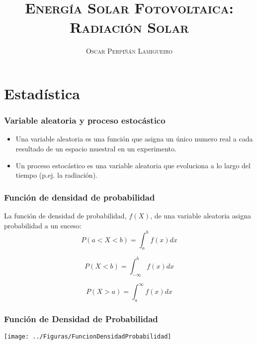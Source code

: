 \documentclass[serif, xcolor=dvipsnames]{beamer}
\begin{document}
\title{\textsc{Energía Solar Fotovoltaica:}\\
\textsc{Radiación Solar}}

\date{}

\author{\textsc{Oscar Perpiñán Lamigueiro}}

\begin{frame}[plain]
  \titlepage
\end{frame}


%

\section{Estadística}


\begin{frame}
\frametitle{Variable aleatoria y proceso estocástico}
\begin{itemize}
\item Una variable aleatoria es una función que asigna un único numero real
a cada resultado de un espacio muestral en un experimento.
\item Un proceso estocástico es una variable aleatoria que evoluciona a
lo largo del tiempo (p.ej. la radiación). 
\end{itemize}

\end{frame}
\begin{frame}
\frametitle{Función de densidad de probabilidad}

La función de densidad de probabilidad, $f(X)$, de una variable aleatoria
asigna probabilidad a un suceso:\[
P(a<X<b)=\int_{a}^{b}f(x)dx\]


\[
P(X<b)=\int_{-\infty}^{b}f(x)dx\]


\[
P(X>a)=\int_{a}^{\infty}f(x)dx\]



\end{frame}

\begin{frame}[plain]
\frametitle{Función de Densidad de Probabilidad}

\begin{center}
\texttt{[image: ../Figuras/FuncionDensidadProbabilidad]}
\par\end{center}


\end{frame}
\end{document}
